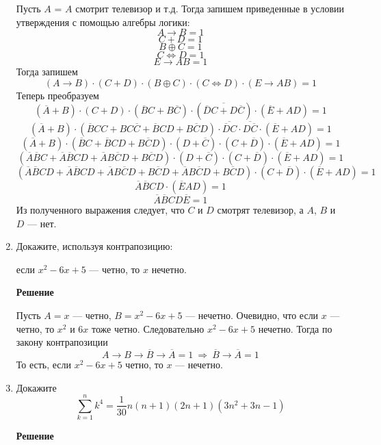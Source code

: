 \documentclass[12pt]{article}
\begin{document}
\begin{enumerate}[label={\textbf{\arabic{section}.\arabic*}}]
		Пусть $A$ = $A$ смотрит телевизор и т.д. Тогда запишем приведенные в условии утверждения с помощью алгебры логики:
		$$
		A \rightarrow B = 1
		$$
		$$
		C + D = 1
		$$
		$$
		B\oplus C = 1
		$$
		$$
		C\Leftrightarrow D = 1
		$$
		$$
		E \rightarrow AB = 1
		$$
		Тогда запишем
		$$
		(A \rightarrow B) \cdot (C + D) \cdot (B\oplus C) \cdot (C\Leftrightarrow D) \cdot (E \rightarrow AB) = 1
		$$
		Теперь преобразуем 
		$$
		(\overline{A} + B) \cdot (C + D) \cdot (\overline{B}C+B\overline{C}) \cdot (\overline{\overline{D}C + D\overline{C}}) \cdot (\overline{E} + AD) = 1
		$$
		$$
		(\overline{A} + B)\cdot (\overline{B}CC + BC\overline{C} + \overline{B}CD + B\overline{C}D)\cdot \overline{\overline{D}C}\cdot \overline{D\overline{C}}\cdot(\overline{E}+AD) = 1
		$$
		$$
		(\overline{A}+B)\cdot (\overline{B}C+\overline{B}CD+B\overline{C}D)\cdot(D+\overline{C})\cdot(C+\overline{D}) \cdot (\overline{E}+AD) = 1
		$$
		$$
		(\overline{A}\overline{B}C+\overline{A}\overline{B}CD +\overline{A}B\overline{C}D+B\overline{C}D)\cdot(D+\overline{C})\cdot(C+\overline{D}) \cdot (\overline{E}+AD) = 1
		$$
		$$
		(\overline{A}\overline{B}CD+\overline{A}\overline{B}CD + \overline{A}B\overline{C}D + B\overline{C}D + \overline{A}B\overline{C}D+B\overline{C}D) \cdot (C + \overline{D}) \cdot (\overline{E} + AD) = 1 
		$$
		$$
		\overline{A}\overline{B}CD \cdot (\overline{E} AD) = 1
		$$
		$$
		\overline{A}\overline{B}CD\overline{E} = 1
		$$
		Из полученного выражения следует, что $C$ и $D$ смотрят телевизор, а $A$, $B$ и $D$ --- нет.
		\item Докажите, используя контрапозицию:
		
		если $x^2-6x+5$ --- четно, то $x$ нечетно.
		
		\textbf{Решение}
		
		Пусть $A = x$ --- четно, $B = x^2 - 6x +5$ --- нечетно. Очевидно, что если $x$ --- четно, то $x^2$ и $6x$ тоже четно. Следовательно $x^2 - 6x +5$ нечетно. Тогда по закону контрапозиции
		$$
		A\rightarrow B \rightarrow \overline{B}\rightarrow \overline{A} = 1~\Rightarrow~\overline{B} \rightarrow \overline{A} = 1 
		$$
		То есть, если $x^2 - 6x +5$ четно, то $x$ --- нечетно.
		
		\item Докажите
		$$
		\sum_{k=1}^n k^4 = \frac{1}{30} n(n+1)(2n+1)(3n^2+3n-1)
		$$
		
		\textbf{Решение}
		

\end{enumerate}
\end{document}
